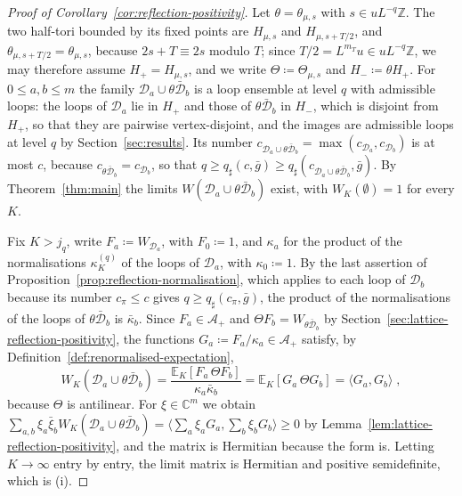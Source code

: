 \documentclass[11pt]{preprint}
\numberwithin{equation}{section}
\theoremstyle{definition}
\theoremstyle{remark}
\theoremstyle{plain}
\begin{document}
\begin{proof}[Proof of Corollary~\ref{cor:reflection-positivity}]
Let $\theta = \theta_{\mu,s}$ with $s \in uL^{-q}\mathbb Z$. The two half-tori bounded by its fixed points are $H_{\mu,s}$ and $H_{\mu,s+T/2}$, and $\theta_{\mu,s+T/2} = \theta_{\mu,s}$, because $2s + T \equiv 2s$ modulo $T$; since $T/2 = L^{m_T}u \in uL^{-q}\mathbb Z$, we may therefore assume $H_+ = H_{\mu,s}$, and we write $\Theta \coloneqq \Theta_{\mu,s}$ and $H_- \coloneqq \theta H_+$. For $0 \leq a, b \leq m$ the family $\mathcal D_a \cup \theta\bar{\mathcal D}_b$ is a loop ensemble at level $q$ with admissible loops: the loops of $\mathcal D_a$ lie in $H_+$ and those of $\theta\bar{\mathcal D}_b$ in $H_-$, which is disjoint from $H_+$, so that they are pairwise vertex-disjoint, and the images are admissible loops at level $q$ by Section~\ref{sec:results}. Its number $c_{\mathcal D_a \cup \theta\bar{\mathcal D}_b} = \max(c_{\mathcal D_a}, c_{\mathcal D_b})$ is at most $c$, because $c_{\theta\bar{\mathcal D}_b} = c_{\mathcal D_b}$, so that $q \geq q_\sharp(c, \bar g) \geq q_\sharp(c_{\mathcal D_a \cup \theta\bar{\mathcal D}_b}, \bar g)$. By Theorem~\ref{thm:main} the limits $W(\mathcal D_a \cup \theta\bar{\mathcal D}_b)$ exist, with $W_K(\emptyset) = 1$ for every $K$.

Fix $K > j_q$, write $F_a \coloneqq W_{\mathcal D_a}$, with $F_0 \coloneqq 1$, and $\kappa_a$ for the product of the normalisations $\kappa^{(q)}_K$ of the loops of $\mathcal D_a$, with $\kappa_0 \coloneqq 1$. By the last assertion of Proposition~\ref{prop:reflection-normalisation}, which applies to each loop of $\mathcal D_b$ because its number $c_\pi \leq c$ gives $q \geq q_\sharp(c_\pi, \bar g)$, the product of the normalisations of the loops of $\theta\bar{\mathcal D}_b$ is $\bar\kappa_b$. Since $F_a \in \mathcal A_+$ and $\Theta F_b = W_{\theta\bar{\mathcal D}_b}$ by Section~\ref{sec:lattice-reflection-positivity}, the functions $G_a \coloneqq F_a/\kappa_a \in \mathcal A_+$ satisfy, by Definition~\ref{def:renormalised-expectation},
\begin{equation}\label{eq:gram-identity}
    W_K(\mathcal D_a \cup \theta\bar{\mathcal D}_b) = \frac{\mathbb E_K[F_a\,\Theta F_b]}{\kappa_a\bar\kappa_b} = \mathbb E_K[G_a\,\Theta G_b] = \langle G_a, G_b\rangle\;,
\end{equation}
because $\Theta$ is antilinear. For $\xi \in \mathbb C^m$ we obtain $\sum_{a,b}\xi_a\bar\xi_bW_K(\mathcal D_a \cup \theta\bar{\mathcal D}_b) = \langle\sum_a\xi_aG_a, \sum_b\xi_bG_b\rangle \geq 0$ by Lemma~\ref{lem:lattice-reflection-positivity}, and the matrix is Hermitian because the form is. Letting $K \to \infty$ entry by entry, the limit matrix is Hermitian and positive semidefinite, which is (i).


\end{proof}
\end{document}
